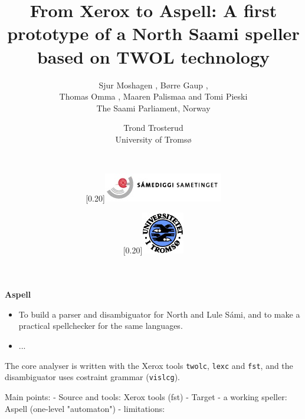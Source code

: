 \documentclass[landscape,english,11pt]{seminar}
\title{From Xerox to Aspell: A first prototype of a North Saami speller
 based on TWOL technology}
\author{Sjur Moshagen
, Børre Gaup
, \\Thomas Omma  
, Maaren Palismaa 
and Tomi Pieski\\ 
 The Saami Parliament, Norway
\and Trond Trosterud\\ University of Tromsø
\and \\
\and \scalebox{0.20}[0.20]{\includegraphics{samediggi.jpg}}
\and \scalebox{0.20}[0.20]{\includegraphics{logoWeb070.jpg}}
}
\begin{document}
\begin{slide}

\maketitle


\newslide

\textbf{Aspell}

\begin{itemize}
\item To build a parser and disambiguator for North and Lule Sámi, and to make a practical spellchecker for the same languages.
\item ...
\end{itemize}


  The core analyser is written with the Xerox tools \texttt{twolc}, \texttt{lexc} and \texttt{fst}, and the disambiguator uses costraint grammar (\texttt{vislcg}).

\newslide

Main points:
- Source and tools: Xerox tools (fst)
- Target - a working speller: Aspell (one-level "automaton")
- limitations:

\end{slide}
\end{document}
